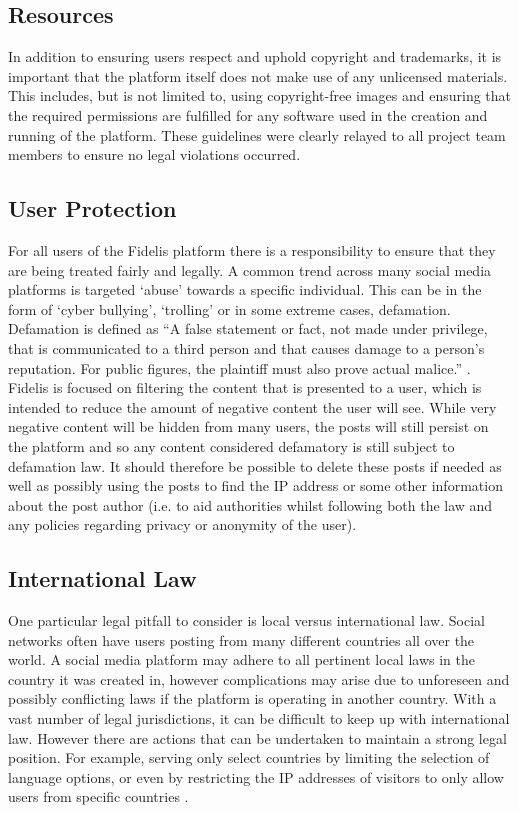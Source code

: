 \subsection{Resources}
In addition to ensuring users respect and uphold copyright and trademarks, it is important that the platform itself does not make use of any unlicensed materials. This includes, but is not limited to, using copyright-free images and ensuring that the required permissions are fulfilled for any software used in the creation and running of the platform. These guidelines were clearly relayed to all project team members to ensure no legal violations occurred.

\subsection{User Protection}
For all users of the Fidelis platform there is a responsibility to ensure that they are being treated fairly and legally. A common trend across many social media platforms is targeted `abuse' towards a specific individual. This can be in the form of `cyber bullying', `trolling' or in some extreme cases, defamation. Defamation is defined as ``A false statement or fact, not made under privilege, that is communicated to a third person and that causes damage to a person’s reputation. For public figures, the plaintiff must also prove actual malice.'' \cite{BusinessLawToday}. Fidelis is focused on filtering the content that is presented to a user, which is intended to reduce the amount of negative content the user will see. While very negative content will be hidden from many users, the posts will still persist on the platform and so any content considered defamatory is still subject to defamation law. It should therefore be possible to delete these posts if needed as well as possibly using the posts to find the IP address or some other information about the post author (i.e. to aid authorities whilst following both the law and any policies regarding privacy or anonymity of the user).

\subsection{International Law}
One particular legal pitfall to consider is local versus international law. Social networks often have users posting from many different countries all over the world. A social media platform may adhere to all pertinent local laws in the country it was created in, however complications may arise due to unforeseen and possibly conflicting laws if the platform is operating in another country. With a vast number of legal jurisdictions, it can be difficult to keep up with international law. However there are actions that can be undertaken to maintain a strong legal position. For example, serving only select countries by limiting the selection of language options, or even by restricting the IP addresses of visitors to only allow users from specific countries \cite{Olswang}.


